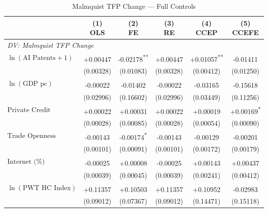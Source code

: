 \begin{table}[htbp]
\centering
\small
\caption{Malmquist TFP Change --- Full Controls}
\label{tab:tab_malmquist_full}
\begin{tabular}{lccccc}
\toprule
 & \makecell{(1)\\OLS} & \makecell{(2)\\FE} & \makecell{(3)\\RE} & \makecell{(4)\\CCEP} & \makecell{(5)\\CCEFE} \\
\midrule
\multicolumn{6}{l}{\textit{DV: Malmquist TFP Change}} \\[4pt]
$\ln(\text{AI Patents}+1)$ & +0.00447\textsuperscript{} & -0.02178\textsuperscript{**} & +0.00447\textsuperscript{} & +0.01057\textsuperscript{**} & -0.01411\textsuperscript{} \\
 & (0.00328) & (0.01083) & (0.00328) & (0.00412) & (0.01250) \\[2pt]
$\ln(\text{GDP pc})$ & -0.00022\textsuperscript{} & -0.01402\textsuperscript{} & -0.00022\textsuperscript{} & -0.03165\textsuperscript{} & -0.15618\textsuperscript{} \\
 & (0.02996) & (0.16602) & (0.02996) & (0.03449) & (0.11256) \\[2pt]
$\text{Private Credit}$ & +0.00022\textsuperscript{} & +0.00031\textsuperscript{} & +0.00022\textsuperscript{} & +0.00019\textsuperscript{} & +0.00169\textsuperscript{*} \\
 & (0.00028) & (0.00085) & (0.00028) & (0.00054) & (0.00090) \\[2pt]
$\text{Trade Openness}$ & -0.00143\textsuperscript{} & -0.00174\textsuperscript{*} & -0.00143\textsuperscript{} & -0.00129\textsuperscript{} & -0.00201\textsuperscript{} \\
 & (0.00101) & (0.00091) & (0.00101) & (0.00172) & (0.00179) \\[2pt]
$\text{Internet (\%)}$ & -0.00025\textsuperscript{} & +0.00008\textsuperscript{} & -0.00025\textsuperscript{} & +0.00143\textsuperscript{} & +0.00437\textsuperscript{} \\
 & (0.00039) & (0.00045) & (0.00039) & (0.00241) & (0.00412) \\[2pt]
$\ln(\text{PWT HC Index})$ & +0.11357\textsuperscript{} & +0.10503\textsuperscript{} & +0.11357\textsuperscript{} & +0.10952\textsuperscript{} & -0.02983\textsuperscript{} \\
 & (0.09012) & (0.07367) & (0.09012) & (0.14471) & (0.15118) \\[2pt]

\end{tabular}
\end{table}
